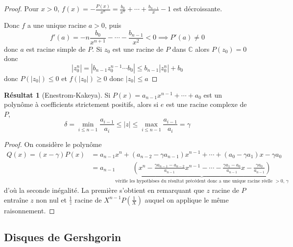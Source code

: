 \documentclass{article}
\theoremstyle{definition}
\newtheorem*{res}{Résultat}
\begin{document}
\begin{proof}
    Pour $x>0$, $f(x)=-\frac{P(x)}{x^n}=\frac{b_0}{x^n}+\cdots + \frac{b_{n-1}}{x}-1$ est décroissante.
    
    \begin{center}
    \end{center}
    Donc $f$ a une unique racine $a>0$, puis \[
        f'(a)=-n\frac{b_0}{x^{n+1}}-\cdots-\frac{b_{n-1}}{x^2}<0 \implies P'(a)\neq 0
    \]
    donc $a$ est racine simple de $P$. Si $z_0$ est une racine de $P$ dans $\mathbb C$ alors $P(z_0)=0$ donc \[
        |z_0^n|=|b_{n-1}z_0^{n-1}\cdots b_0|\leq b_{n-1}|z_0^n|+b_0
    \]
    donc $P(|z_0|)\leq 0$ et $f(|z_0|)\geq 0$ donc $|z_0|\leq a$
\end{proof}

\begin{res}[Enestrom-Kakeya]
    Si $P(x)=a_{n-1}x^{n-1}+\cdots +a_0$ est un polynôme à coefficients strictement positifs, alors si $e$ est une racine complexe de $P$, \[
        \delta=\min_{i\leq n-1}\frac{a_{i-1}}{a_i} \leq |z|\leq \max_{i\leq n-1}\frac{a_{i-1}}{a_i}=\gamma
    \]
\end{res}

\begin{proof}
    On considère le polynôme \begin{align*}
        Q(x)=(x-\gamma)P(x)&=a_{n-1}x^{n}+(a_{n-2}-\gamma a_{n-1})x^{n-1}+\cdots +(a_0-\gamma a_1)x -\gamma a_0\\ &= a_{n-1}\underbrace{\left(x^n-\frac{\gamma a_{n-1}-a_{n-2}}{a_{n-1}}x^{n-1} -\cdots -\frac{\gamma a_1-a_0}{a_{n-1}}x-\frac{\gamma a_0}{a_{n-1}}\right)}_{\text{vérifie les hypothèses du résultat précédent donc a une unique racine réelle $>0$, $\gamma$}}
    \end{align*}
    d'où la seconde inégalité. La première s'obtient en remarquant que $z$ racine de $P$ entraîne $z$ non nul et $\frac 1z$ racine de $X^{n-1}P\left(\frac1X\right)$ auquel on applique le même raisonnement.
\end{proof}

\subsection{Disques de Gershgorin}
\end{document}
